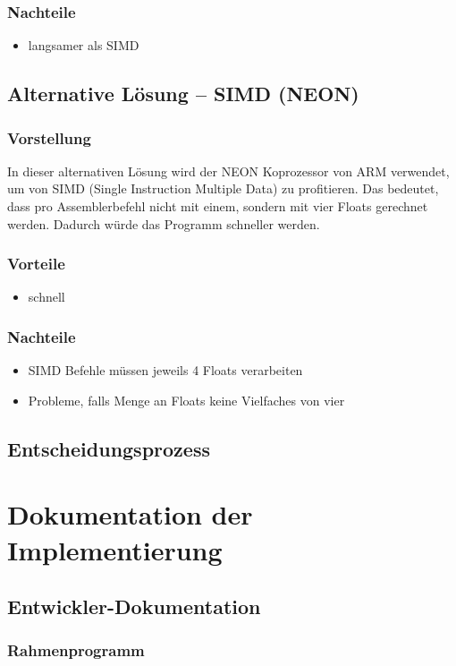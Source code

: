 \documentclass[11pt]{scrartcl}
\begin{document}
\subsubsection{Nachteile}
\begin{itemize}
\item langsamer als SIMD
\end{itemize}
\subsection{Alternative Lösung -- SIMD (NEON)}
\subsubsection{Vorstellung}
In dieser alternativen Lösung wird der NEON Koprozessor von ARM verwendet, um von SIMD (Single Instruction Multiple Data)
zu profitieren. Das bedeutet, dass pro Assemblerbefehl nicht mit einem, sondern mit vier Floats gerechnet werden. Dadurch würde das Programm schneller werden.
\subsubsection{Vorteile}
\begin{itemize}
\item schnell
\end{itemize}
\subsubsection{Nachteile}
\begin{itemize}
\item SIMD Befehle müssen jeweils 4 Floats verarbeiten
\item Probleme, falls Menge an Floats keine Vielfaches von vier
\end{itemize}
\subsection{Entscheidungsprozess}
\section{Dokumentation der Implementierung}
\subsection{Entwickler-Dokumentation}
\subsubsection{Rahmenprogramm}
\end{document}
